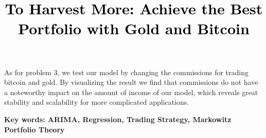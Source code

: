 \documentclass[12pt,a4paper]{article}
\newcommand{\PaperTitle}{To Harvest More: Achieve the Best Portfolio with Gold and Bitcoin}  %
\begin{document}
\begin{spacing}{1.2}
As for problem 3, we test our model by changing the commissions for trading bitcoin and gold. By visualizing the result we find that commissions do not have a noteworthy impact on the amount of income of our model, which reveals great stability and scalability for more complicated applications.




\textbf{Key words: ARIMA, Regression, Trading Strategy, Markowitz Portfolio Theory} 

\end{spacing}

\thispagestyle{empty}


\newpage

\title{
\Large{\textcolor{black}{\PaperTitle}}
}




\maketitle



\tableofcontents
\setcounter{tocdepth}{2}

\newpage
\setcounter{page}{1}

\end{document}
